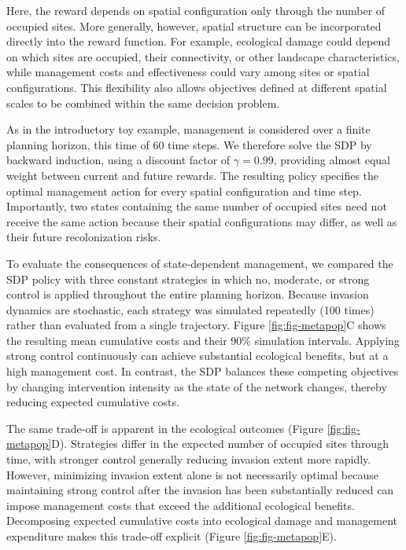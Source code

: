 \documentclass[
  11pt,
  a4paper,
]{article}
\begin{document}
Here, the reward depends on spatial configuration only through the number of occupied sites. More generally, however, spatial structure can be incorporated directly into the reward function. For example, ecological damage could depend on which sites are occupied, their connectivity, or other landscape characteristics, while management costs and effectiveness could vary among sites or spatial configurations. This flexibility also allows objectives defined at different spatial scales to be combined within the same decision problem.

As in the introductory toy example, management is considered over a finite planning horizon, this time of 60 time steps. We therefore solve the SDP by backward induction, using a discount factor of \(\gamma=0.99\), providing almost equal weight between current and future rewards. The resulting policy specifies the optimal management action for every spatial configuration and time step. Importantly, two states containing the same number of occupied sites need not receive the same action because their spatial configurations may differ, as well as their future recolonization risks.

To evaluate the consequences of state-dependent management, we compared the SDP policy with three constant strategies in which no, moderate, or strong control is applied throughout the entire planning horizon. Because invasion dynamics are stochastic, each strategy was simulated repeatedly (100 times) rather than evaluated from a single trajectory. Figure \ref{fig:fig-metapop}C shows the resulting mean cumulative costs and their 90\% simulation intervals. Applying strong control continuously can achieve substantial ecological benefits, but at a high management cost. In contrast, the SDP balances these competing objectives by changing intervention intensity as the state of the network changes, thereby reducing expected cumulative costs.

The same trade-off is apparent in the ecological outcomes (Figure \ref{fig:fig-metapop}D). Strategies differ in the expected number of occupied sites through time, with stronger control generally reducing invasion extent more rapidly. However, minimizing invasion extent alone is not necessarily optimal because maintaining strong control after the invasion has been substantially reduced can impose management costs that exceed the additional ecological benefits. Decomposing expected cumulative costs into ecological damage and management expenditure makes this trade-off explicit (Figure \ref{fig:fig-metapop}E).
\end{document}
